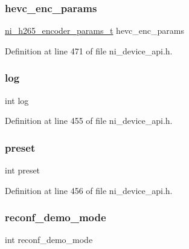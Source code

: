 \subsubsection{\texorpdfstring{hevc\_enc\_params}{hevc\_enc\_params}}
{\footnotesize\ttfamily \mbox{\hyperlink{ni__device__api_8h_a9ed113908cee0b8c3d4d83cc6845a8da}{ni\+\_\+h265\+\_\+encoder\+\_\+params\+\_\+t}} hevc\+\_\+enc\+\_\+params}



Definition at line 471 of file ni\+\_\+device\+\_\+api.\+h.

\mbox{\label{struct__ni__encoder__params_a4fe6497d2ca697003ddd3e2f1f8ec44f}} 
\subsubsection{\texorpdfstring{log}{log}}
{\footnotesize\ttfamily int log}



Definition at line 455 of file ni\+\_\+device\+\_\+api.\+h.

\mbox{\label{struct__ni__encoder__params_a2e9d3076c7fd698357ca478e223b7286}} 
\subsubsection{\texorpdfstring{preset}{preset}}
{\footnotesize\ttfamily int preset}



Definition at line 456 of file ni\+\_\+device\+\_\+api.\+h.

\mbox{\label{struct__ni__encoder__params_a6286eade10a2d4a954acdb3d32f71509}} 
\subsubsection{\texorpdfstring{reconf\_demo\_mode}{reconf\_demo\_mode}}
{\footnotesize\ttfamily int reconf\+\_\+demo\+\_\+mode}



